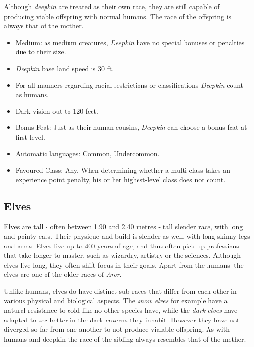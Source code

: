 Although \emph{deepkin} are treated as their own race, they are still capable
of producing viable offspring with normal humans. The race of the offspring is
always that of the mother.

\begin{35e}
  \begin{itemize}[noitemsep]
    \item Medium: as medium creatures, \emph{Deepkin} have no special bonuses or
    penalties due to their size.
    \item \emph{Deepkin} base land speed is 30 ft.
    \item For all manners regarding racial restrictions or classifications
    \emph{Deepkin} count as humans.
    \item Dark vision out to 120 feet.
    \item Bonus Feat: Just as their human cousins, \emph{Deepkin} can choose a
    bonus feat at first level.
    \item Automatic languages: Common, Undercommon.
    \item Favoured Class: Any. When determining whether a multi class takes an
    experience point penalty, his or her highest-level class does not count.
  \end{itemize}
\end{35e}

\subsection*{Elves}

Elves are tall - often between 1.90 and 2.40 metres - tall slender race, with
long and pointy ears. Their physique and build is slender as well, with long
skinny legs and arms. Elves live up to 400 years of age, and thus often pick
up professions that take longer to master, such as wizardry, artistry or the
sciences. Although elves live long, they often shift focus in their
goals. Apart from the humans, the elves are one of the older races
of \emph{Aror}.

Unlike humans, elves do have distinct sub races that differ from each other in
various physical and biological aspects. The \emph{snow elves} for example
have a natural resistance to cold like no other species have, while the
\emph{dark elves} have adapted to see better in the dark caverns they
inhabit. However they have not diverged so far from one another to not produce
vialable offspring. As with humans and deepkin the race of the sibling always
resembles that of the mother.

